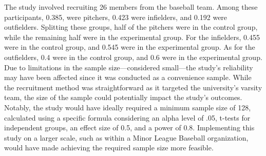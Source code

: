 \documentclass[12pt]{article}
\begin{document}
The study involved recruiting 26 members from the baseball team. Among these participants, 0.385, were pitchers, 0.423 were infielders, and 0.192 were outfielders. 
Splitting these groups, half of the pitchers were in the control group, while the remaining half were in the experimental group. For the infielders, 
0.455 were in the control group, and 0.545 were in the experimental group. As for the outfielders, 0.4 were in the control group, and 0.6 were in the experimental group.
Due to limitations in the sample size—considered small—the study's reliability may have been affected since it was conducted as a convenience sample. 
While the recruitment method was straightforward as it targeted the university's varsity team, the size of the sample could potentially impact the study's outcomes. 
Notably, the study would have ideally required a minimum sample size of 128, calculated using a specific formula considering an alpha level of .05, t-tests for independent groups, 
an effect size of 0.5, and a power of 0.8. Implementing this study on a larger scale, such as within a Minor League Baseball organization, 
would have made achieving the required sample size more feasible. 







\end{document}
